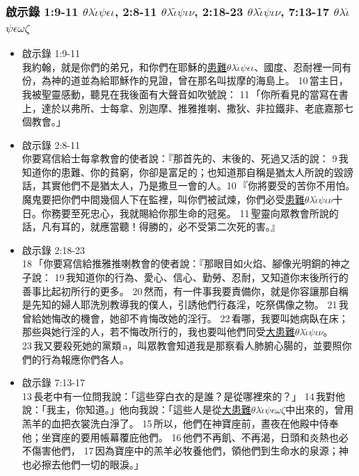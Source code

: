  \subsubsection{啟示錄 1:9-11 $\theta$$\lambda$$\acute{\iota}$$\psi$$\epsilon$$\iota$, 2:8-11 $\theta$$\lambda$$\tilde{\iota}$$\psi$$\iota$$\nu$, 2:18-23 $\theta$$\lambda$$\tilde{\iota}$$\psi$$\iota$$\nu$, 7:13-17 $\theta$$\lambda$$\acute{\iota}$$\psi$$\epsilon$$\omega$$\zeta$} 
  \begin{itemize} 
\itemsep-.25em
\item{啟示錄 1:9-11}\\
 我約翰，就是你們的弟兄，和你們在耶穌的\underline{患難$\theta$$\lambda$$\acute{\iota}$$\psi$$\epsilon$$\iota$}、國度、忍耐裡一同有份，為神的道並為給耶穌作的見證，曾在那名叫拔摩的海島上。 10 當主日，我被聖靈感動，聽見在我後面有大聲音如吹號說： 11 「你所看見的當寫在書上，達於以弗所、士每拿、別迦摩、推雅推喇、撒狄、非拉鐵非、老底嘉那七個教會。」   
    
\item{啟示錄 2:8-11} \\ 
你要寫信給士每拿教會的使者說：『那首先的、末後的、死過又活的說： 9 我知道你的患難、你的貧窮，你卻是富足的；也知道那自稱是猶太人所說的毀謗話，其實他們不是猶太人，乃是撒旦一會的人。10 『你將要受的苦你不用怕。魔鬼要把你們中間幾個人下在監裡，叫你們被試煉，你們必受\underline{患難$\theta$$\lambda$$\tilde{\iota}$$\psi$$\iota$$\nu$}十日。你務要至死忠心，我就賜給你那生命的冠冕。 11 聖靈向眾教會所說的話，凡有耳的，就應當聽！得勝的，必不受第二次死的害。』

\item{啟示錄 2:18-23}   \\       
  18 「你要寫信給推雅推喇教會的使者說：『那眼目如火焰、腳像光明銅的神之子說： 19 我知道你的行為、愛心、信心、勤勞、忍耐，又知道你末後所行的善事比起初所行的更多。 20 然而，有一件事我要責備你，就是你容讓那自稱是先知的婦人耶洗別教導我的僕人，引誘他們行姦淫，吃祭偶像之物。 21 我曾給她悔改的機會，她卻不肯悔改她的淫行。 22 看哪，我要叫她病臥在床；那些與她行淫的人，若不悔改所行的，我也要叫他們同受\underline{大患難$\theta$$\lambda$$\tilde{\iota}$$\psi$$\iota$$\nu$}。 23 我又要殺死她的黨類 a，叫眾教會知道我是那察看人肺腑心腸的，並要照你們的行為報應你們各人。   
 \item{啟示錄 7:13-17} \\    
  13 長老中有一位問我說：「這些穿白衣的是誰？是從哪裡來的？」 14 我對他說：「我主，你知道。」他向我說：「這些人是從\underline{大患難$\theta$$\lambda$$\acute{\iota}$$\psi$$\epsilon$$\omega$$\zeta$}中出來的，曾用羔羊的血把衣裳洗白淨了。 15 所以，他們在神寶座前，晝夜在他殿中侍奉他；坐寶座的要用帳幕覆庇他們。 16 他們不再飢、不再渴，日頭和炎熱也必不傷害他們， 17 因為寶座中的羔羊必牧養他們，領他們到生命水的泉源；神也必擦去他們一切的眼淚。」   
\end{itemize}










